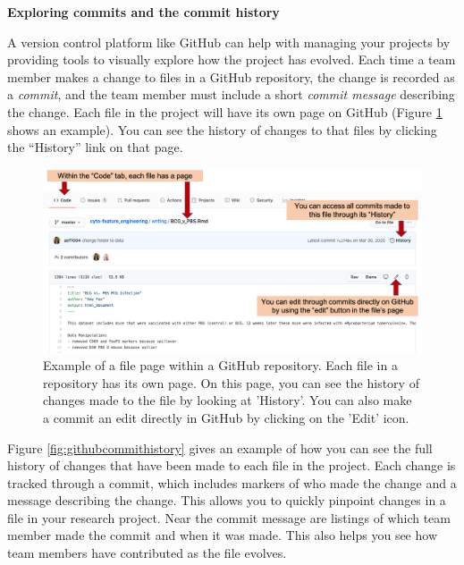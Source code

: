 \documentclass[]{tufte-book}
\begin{document}
\textbf{Exploring commits and the commit history}

A version control platform like GitHub can help with managing your projects
by providing tools to visually explore how the project has evolved.
Each time a team member makes a change to files in a GitHub repository, the
change is recorded as a \emph{commit}, and the team member must include a short
\emph{commit message} describing the change. Each file in the project will have its
own page on GitHub (Figure \ref{fig:githubcommits1} shows an example). You can
see the history of changes to that files by clicking the ``History'' link on that
page.

\begin{figure}
\includegraphics[width=\textwidth]{figures/github_commits1} \caption[Example of a file page within a GitHub repository]{Example of a file page within a GitHub repository. Each file in a repository has its own page. On this page, you can see the history of changes made to the file by looking at 'History'. You can also make a commit an edit directly in GitHub by clicking on the 'Edit' icon.}\label{fig:githubcommits1}
\end{figure}

Figure \ref{fig:githubcommithistory} gives an example of how you can see the
full history of changes that have been made to each file in the project. Each
change is tracked through a commit, which includes markers of who made the
change and a message describing the change. This allows you to quickly pinpoint
changes in a file in your research project. Near the commit message are listings
of which team member made the commit and when it was made. This also helps you
see how team members have contributed as the file evolves.
\end{document}
